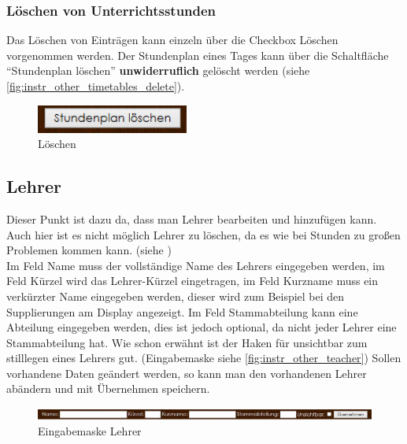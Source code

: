 \subsubsection{Löschen von Unterrichtsstunden}
Das Löschen von Einträgen kann einzeln über die Checkbox Löschen vorgenommen werden. Der Stundenplan eines Tages kann über die Schaltfläche \enquote{Stundenplan löschen} \textbf{unwiderruflich} gelöscht werden (siehe \autoref{fig:instr_other_timetables_delete}).
\begin{figure}[H]
\centering
\includegraphics[keepaspectratio=true, width=5cm]{images/screenshots/timetables_input_delete.png}
\caption{Löschen}
\label{fig:instr_other_timetables_delete}
\end{figure}
\subsection{Lehrer}
Dieser Punkt ist dazu da, dass man Lehrer bearbeiten und hinzufügen kann. Auch hier ist es nicht möglich Lehrer zu löschen, da es wie bei Stunden zu großen Problemen kommen kann. (siehe )\\
Im Feld Name muss der vollständige Name des Lehrers eingegeben werden, im Feld Kürzel wird das Lehrer-Kürzel eingetragen, im Feld Kurzname muss ein verkürzter Name eingegeben werden, dieser wird zum Beispiel bei den Supplierungen am Display angezeigt. Im Feld Stammabteilung kann eine Abteilung eingegeben werden, dies ist jedoch optional, da nicht jeder Lehrer eine Stammabteilung hat. Wie schon erwähnt ist der Haken für unsichtbar zum stilllegen eines Lehrers gut. (Eingabemaske siehe \autoref{fig:instr_other_teacher}) Sollen vorhandene Daten geändert werden, so kann man den vorhandenen Lehrer abändern und mit Übernehmen speichern.
\begin{figure}[H]
\centering
\includegraphics[keepaspectratio=true, width=17cm]{images/screenshots/teachers_input.png}
\caption{Eingabemaske Lehrer}
\label{fig:instr_other_teacher}
\end{figure}

